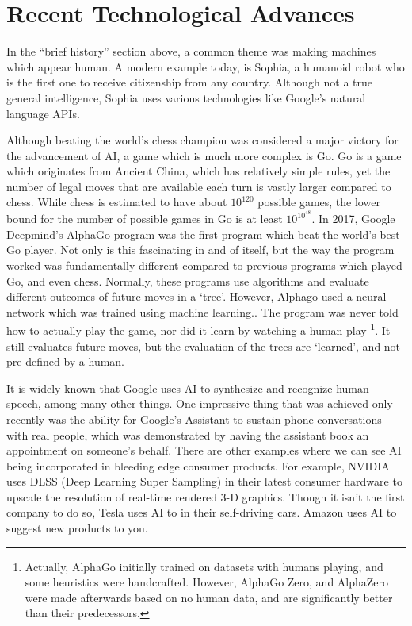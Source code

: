 \documentclass[letterpaper,12pt]{article}
\begin{document}
\section{Recent Technological Advances}

In the ``brief history'' section above, a common theme was making machines
which appear human. A modern example today, is Sophia, a humanoid robot
who is the first one to receive citizenship from any country.
Although not a true general intelligence\cite{sopiaAI}, Sophia uses various 
technologies like Google's natural language APIs.

Although beating the world's chess champion was considered a major
victory for the advancement of AI,
a game which is much more complex is Go.
Go is a game which originates from Ancient China,
which has relatively simple rules, yet the number of legal
moves that are available each turn is vastly larger compared to chess.
While chess is estimated to have about $10^{120}$ 
possible games, the lower bound for the number of possible games in
Go is at least $10^{10^{48}}$.\cite{Combinatoricsgo}
In 2017, Google Deepmind's AlphaGo program was the first program which beat the world's
best Go player. Not only is this fascinating in and of itself, but the 
way the program worked was fundamentally different compared to previous 
programs which played Go, and even chess. Normally, these programs
use algorithms and evaluate different outcomes of future moves
in a `tree'. However, Alphago used a neural network which was trained
using machine learning.\cite{alphagopaper}. The program was never told how to
actually play the game, nor did it learn by watching a human play
\footnote{Actually, AlphaGo initially trained on datasets with humans playing,
and some heuristics were handcrafted. However, AlphaGo Zero, and AlphaZero
were made afterwards based on no human data, and are significantly
better than their predecessors.}. It still
evaluates future moves, but the evaluation of the trees are `learned', and 
not pre-defined by a human.

It is widely known that Google uses AI to synthesize and recognize human speech,
among many other things. One impressive thing that was
achieved only recently was the
ability for Google's Assistant to sustain phone conversations with real
people, which was demonstrated by having the assistant book an appointment on someone's behalf.\cite{googleduplex} 
There are other examples where we can see AI being incorporated in bleeding edge consumer products.
For example, NVIDIA uses DLSS (Deep Learning Super Sampling) in their latest consumer hardware to
upscale the resolution of real-time rendered 3-D graphics.\cite{dlss}
Though it isn't the first company to do so, Tesla uses AI to in their self-driving cars.\cite{teslaautopilot}
Amazon uses AI to suggest new products to you.\cite{aznai}
\end{document}
